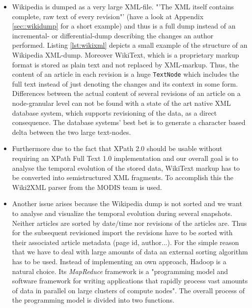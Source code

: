 \begin{itemize}
\item Wikipedia is dumped as a very large XML-file. "'The XML itself contains complete, raw text of every revision"'\cite{WikiDump} (have a look at Appendix \ref{sec::wikidump} for a short example) and thus is a full dump instead of an incremental- or differential-dump describing the changes an author performed. Listing \ref{lst:wikixml} depicts a small example of the structure of an Wikipedia XML-dump. Moreover WikiText, which is a proprietary markup format is stored as plain text and not replaced by XML-markup. Thus, the content of an article in each revision is a huge \texttt{TextNode} which includes the full text instead of just denoting the changes and its context in some form. Differences between the actual content of several revisions of an article on a node-granular level can not be found with a state of the art native XML database system, which supports revisioning of the data, as a direct consequence. The database systems' best bet is to generate a character based delta between the two large text-nodes.

\item Furthermore due to the fact that XPath 2.0 should be usable without requiring an XPath Full Text 1.0 implementation and our overall goal is to analyse the temporal evolution of the stored data, WikiText markup has to be converted into semistructured XML fragments. To accomplish this the Wiki2XML parser from the MODIS team \cite{Wiki2XML} is used.

\item Another issue arises because the Wikipedia dump is not sorted and we want to analyse and visualize the temporal evolution during several snapshots. Neither articles are sorted by date/time nor revisions of the articles are. Thus for the subsequent revisioned import the revisions have to be sorted with their associated article metadata (page id, author...). For the simple reason that we have to deal with large amounts of data an external sorting algorithm has to be used. Instead of implementing an own approach, Hadoop is a natural choice. Its \emph{MapReduce} framework is a "programming model and software framework for writing applications that rapidly process vast amounts of data in parallel on large clusters of compute nodes". The overall process of the programming model is divided into two functions.
\end{itemize}

